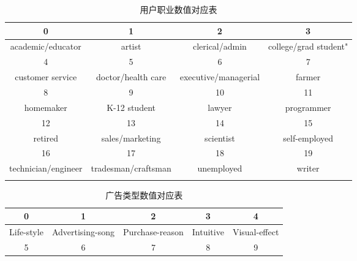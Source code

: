 \begin{enumerate}[(1)]
    \begin{table}[H]
        \centering
        \caption{用户职业数值对应表}
        \begin{tabular}{cccc}
        \Xhline{1.2pt}
        0                     & 1                   & 2                    & 3                     \\
        \hline
        academic/educator     & artist              & clerical/admin       & college/grad student" \\
        \Xhline{1.2pt}
        4                     & 5                   & 6                    & 7                     \\
        \hline
        customer service      & doctor/health care  & executive/managerial & farmer                \\
        \Xhline{1.2pt}
        8                     & 9                   & 10                   & 11                    \\
        \hline
        homemaker             & K-12 student        & lawyer               & programmer            \\
        \Xhline{1.2pt}
        12                    & 13                  & 14                   & 15                    \\
        \hline
        retired               & sales/marketing     & scientist            & self-employed         \\
        \Xhline{1.2pt}
        16                    & 17                  & 18                   & 19                    \\
        \hline
        technician/engineer   & tradesman/craftsman & unemployed           & writer               \\
        \Xhline{1.2pt}
        \end{tabular}
    \end{table}
    \begin{table}[H]
        \centering
        \caption{广告类型数值对应表}
        \begin{tabular}{ccccc}
        \Xhline{1.2pt}
        0                            & 1                & 2                  & 3              & 4             \\
        \hline
        Life-style                   & Advertising-song & Purchase-reason    & Intuitive      & Visual-effect \\
        \Xhline{1.2pt}
        5                            & 6                & 7                  & 8              & 9             \\

\end{tabular}
\end{table}
\end{enumerate}
